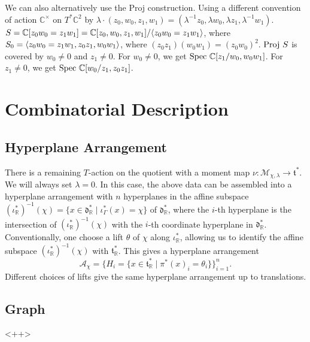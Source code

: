 \documentclass[b5paper]{article}
\newcommand{\Proj}{\textnormal{Proj }}
\newcommand{\Spec}{\textnormal{Spec }}
\begin{document}
\begin{example}[exp:]{}
  We can also alternatively use the Proj construction. Using a different convention of action $\mathbb{C}^\times $ on $T^*\mathbb{C}^2$ by $\lambda\cdot (z_0,w_0,z_1,w_1)=(\lambda^{-1}z_0,\lambda w_0,\lambda z_1,\lambda^{-1}w_1)$. $S=\mathbb{C}[z_0w_0=z_1w_1]=\mathbb{C}[z_0,w_0,z_1,w_1]/\langle z_0w_0=z_1w_1\rangle$, where $S_0=\langle z_0w_0=z_1w_1, z_0z_1,w_0w_1\rangle$, where $(z_0z_1)(w_0w_1)=(z_0w_0)^2$. $\Proj S$ is covered by $w_0\neq 0$ and $z_1\neq 0$. For $w_0\neq 0$, we get $\Spec \mathbb{C}[z_1/w_0,w_0w_1]$. For $z_1\neq 0$, we get $\Spec\mathbb{C}[w_0/z_1,z_0z_1]$.
\end{example}

\section{Combinatorial Description}

\subsection{Hyperplane Arrangement}

There is a remaining $T$-action on the quotient with a moment map $ \nu : \mathcal{M}_{\chi, \lambda} \to \mathfrak{t}^* $. We will always set $\lambda=0$. In this case, the above data can be assembled into a hyperplane arrangement with $n$ hyperplanes in the affine subspace $ (\iota_{\mathbb{R}}^*)^{-1}(\chi) = \{ x \in \mathfrak{d}_{\mathbb{R}}^* \mid \iota_{\Gamma}^*(x) = \chi \} $ of $\mathfrak{d}_{\mathbb{R}}^*$, where the $i$-th hyperplane is the intersection of $(\iota_{\mathbb{R}}^*)^{-1}(\chi)$ with the $i$-th coordinate hyperplane in $\mathfrak{d}_{\mathbb{R}}^*$. Conventionally, one choose a lift $\theta$ of $\chi$ along $\iota_\mathbb{R}^*$, allowing us to identify the affine subspace $(\iota_{\mathbb{R}}^*)^{-1}(\chi)$ with $\mathfrak{t}_\mathbb{R}^*$. This gives a hyperplane arrangement
\begin{equation*}
    \mathcal{A}_\chi = \{ H_i = \{ x \in \mathfrak{t}_{\mathbb{R}}^* \mid \pi^*(x)_i = \theta_i \} \}_{i=1}^n.
\end{equation*}
Different choices of lifts give the same hyperplane arrangement up to translations.

\subsection{Graph}

<++>
\end{document}
